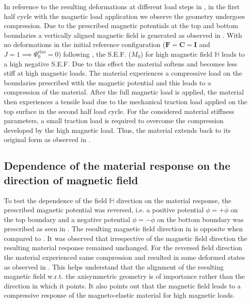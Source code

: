 \documentclass[11pt,a4paper,final]{article}
\begin{document}
In reference to the resulting deformations at different load steps in , in the first half cycle with the magnetic load application we observe the geometry undergoes compression. Due to the prescribed magnetic potentials at the top and bottom boundaries a vertically aligned magnetic field is generated as observed in . With no deformations in the initial reference configuration ($\mathbf{F} = \mathbf{C} = \mathbf{I}$ and $J = 1 \implies \Psi_0^{\text{elas}} = 0$) following , the S.E.F. ($M_0$) for high magnetic field $\mathbb{H}$ leads to a high negative S.E.F. Due to this effect the material softens and becomes less stiff at high magnetic loads. The material experiences a compressive load on the boundaries prescribed with the magnetic potential and this leads to a compression of the material. After the full magnetic load is applied, the material then experiences a tensile load due to the mechanical traction load applied on the top surface in the second half load cycle. For the considered material stiffness parameters, a small traction load is required to overcome the compression developed by the high magnetic load. Thus, the material extends back to its original form as observed in . \par 

\subsection{Dependence of the material response on the direction of magnetic field}
To test the dependence of the field $\mathbb{H}$ direction on the material response, the prescribed magnetic potential was reversed, i.e. a positive potential $\phi = +\overline{\phi}$ on the top boundary and a negative potential $\phi = -\overline{\phi}$ on the bottom boundary was prescribed as seen in . The resulting magnetic field direction in  is opposite when compared to . It was observed that irrespective of the magnetic field direction the resulting material response remained unchanged. For the reversed field direction the material experienced same compression and resulted in same deformed states as observed in . This helps understand that the alignment of the resulting magnetic field w.r.t. the axisymmetric geometry is of importance rather than the direction in which it points. It also points out that the magnetic field leads to a compressive response of the magneto-elastic material for high magnetic loads. \par 
\end{document}
